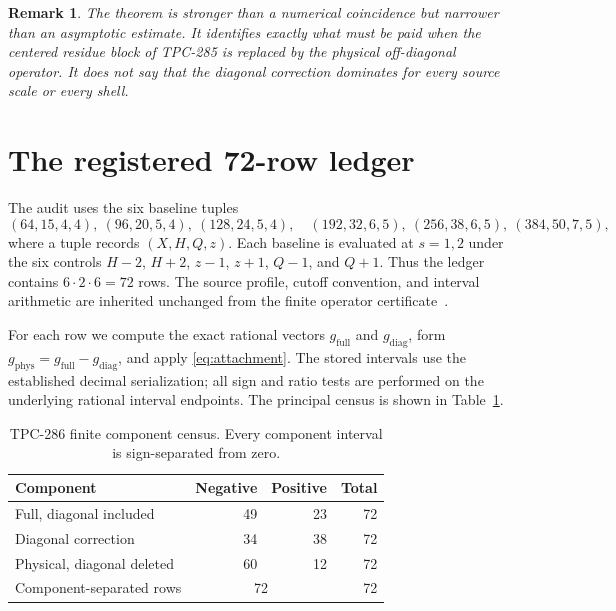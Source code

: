 \documentclass[11pt]{article}
\newtheorem{remark}[theorem]{Remark}
\newcommand{\1}{\mathbf{1}}
\newcommand{\phys}{\mathrm{phys}}
\newcommand{\full}{\mathrm{full}}
\newcommand{\del}{\mathrm{diag}}
\begin{document}
\begin{remark}
The theorem is stronger than a numerical coincidence but narrower than an
asymptotic estimate.  It identifies exactly what must be paid when the
centered residue block of TPC-285 is replaced by the physical off-diagonal
operator.  It does not say that the diagonal correction dominates for every
source scale or every shell.
\end{remark}

\section{The registered 72-row ledger}

The audit uses the six baseline tuples
\begin{equation}
 (64,15,4,4),\ (96,20,5,4),\ (128,24,5,4),\quad
 (192,32,6,5),\ (256,38,6,5),\ (384,50,7,5),
 \label{eq:baselines}
\end{equation}
where a tuple records $(X,H,Q,z)$.  Each baseline is evaluated at
$s=1,2$ under the six controls $H-2$, $H+2$, $z-1$, $z+1$, $Q-1$, and
$Q+1$.  Thus the ledger contains $6\cdot2\cdot6=72$ rows.  The source
profile, cutoff convention, and interval arithmetic are inherited unchanged
from the finite operator certificate~\cite{tpc268}.

For each row we compute the exact rational vectors $g_{\full}$ and $g_{\del}$,
form $g_{\phys}=g_{\full}-g_{\del}$, and apply \eqref{eq:attachment}.  The
stored intervals use the established decimal serialization; all sign and
ratio tests are performed on the underlying rational interval endpoints.
The principal census is shown in Table~\ref{tab:census}.

\begin{table}[H]
\centering
\small
\caption{TPC-286 finite component census.  Every component interval is
sign-separated from zero.}
\label{tab:census}
\begin{tabular}{lrrr}
\toprule
Component & Negative & Positive & Total\\
\midrule
Full, diagonal included & 49 & 23 & 72\\
Diagonal correction & 34 & 38 & 72\\
Physical, diagonal deleted & 60 & 12 & 72\\
\midrule
Component-separated rows & \multicolumn{2}{c}{72} & 72\\
\bottomrule
\end{tabular}
\end{table}
\end{document}
